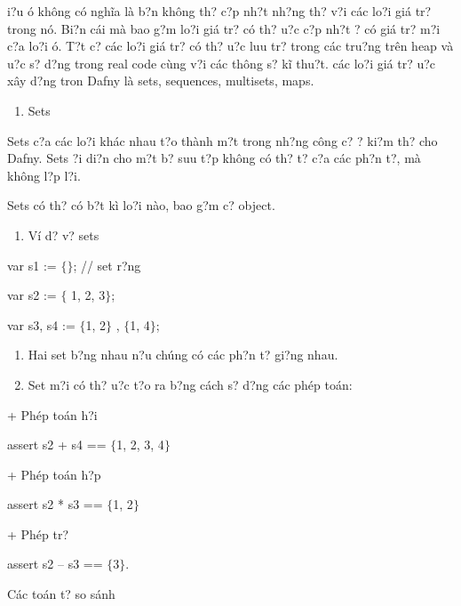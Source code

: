 \documentclass{article} %
\begin{document}
{\DJ}i?u {\dj}\'{o} kh\^{o}ng c\'{o} ngh\~{i}a l\`{a} b?n kh\^{o}ng th? c?p nh?t nh?ng th? v?i c\'{a}c lo?i gi\'{a} tr? trong n\'{o}. Bi?n c\'{a}i m\`{a} bao g?m lo?i gi\'{a} tr? c\'{o} th? {\dj}u?c c?p nh?t {\dj}? c\'{o} gi\'{a} tr? m?i c?a lo?i {\dj}\'{o}. T?t c? c\'{a}c lo?i gi\'{a} tr? c\'{o} th? {\dj}u?c luu tr? trong c\'{a}c tru?ng tr\^{e}n heap v\`{a} {\dj}u?c s? d?ng trong real code c\`{u}ng v?i c\'{a}c th\^{o}ng s? k\~{i} thu?t. c\'{a}c lo?i gi\'{a} tr? {\dj}u?c x\^{a}y d?ng tron Dafny l\`{a} sets, sequences, multisets, maps. 

\begin{enumerate}
\item  Sets
\end{enumerate}

Sets c?a c\'{a}c lo?i kh\'{a}c nhau t?o th\`{a}nh m?t trong nh?ng c\^{o}ng c? {\dj}? ki?m th? cho Dafny. Sets {\dj}?i di?n cho m?t b? suu t?p kh\^{o}ng c\'{o} th? t? c?a c\'{a}c ph?n t?, m\`{a} kh\^{o}ng l?p l?i.

Sets c\'{o} th? c\'{o} b?t k\`{i} lo?i n\`{a}o, bao g?m c? object.

\begin{enumerate}
\item  V\'{i} d? v? sets
\end{enumerate}

\noindent var s1 := $\{$$\}$; // set r?ng

\noindent var s2 := $\{$ 1, 2, 3$\}$;

\noindent var s3, s4 := $\{$1, 2$\}$ , $\{$1, 4$\}$;

\begin{enumerate}
\item  Hai set b?ng nhau n?u ch\'{u}ng c\'{o} c\'{a}c ph?n t? gi?ng nhau.

\item  Set m?i c\'{o} th? {\dj}u?c t?o ra b?ng c\'{a}ch s? d?ng c\'{a}c ph\'{e}p to\'{a}n:
\end{enumerate}

\noindent + Ph\'{e}p to\'{a}n h?i

\noindent assert s2 + s4 == $\{$1, 2, 3, 4$\}$

\noindent + Ph\'{e}p to\'{a}n h?p

\noindent assert s2 * s3 == $\{$1, 2$\}$

\noindent + Ph\'{e}p tr?

\noindent assert  s2 -- s3 == $\{$3$\}$.

\noindent C\'{a}c to\'{a}n t? so s\'{a}nh
\end{document}
